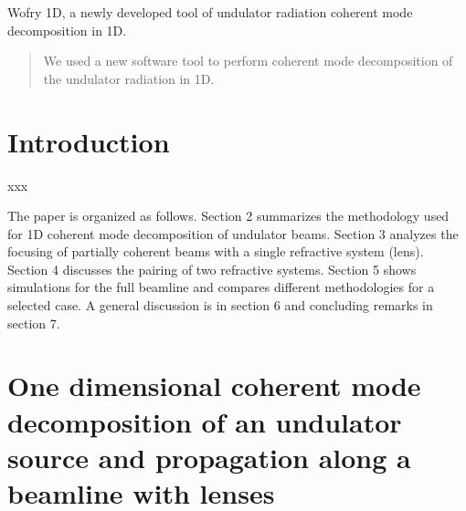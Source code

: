 \documentclass{iucr}              %
\begin{document}
\begin{synopsis}
Wofry 1D, a newly developed tool of undulator radiation coherent mode decomposition in 1D.
\end{synopsis}

\begin{abstract}
We used a new software tool to perform coherent mode decomposition of the undulator radiation in 1D.  
\end{abstract}



\section{Introduction}


xxx

The paper is organized as follows. Section 2 summarizes the methodology used for 1D coherent mode decomposition of undulator beams. Section 3 analyzes the focusing of partially coherent beams with a single refractive system (lens). Section 4 discusses the pairing of two refractive systems. Section 5 shows simulations for the full beamline and compares different methodologies for a selected case. A general discussion is in section 6 and concluding remarks in section 7. 

\section{One dimensional coherent mode decomposition of an undulator source and propagation along a beamline with lenses}
\end{document}
